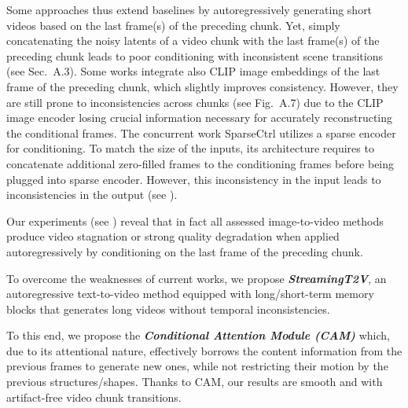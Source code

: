 Some approaches  \cite{oh2023mtvg,AlignYourLatents,video-diffusion-models,opensora}
thus extend baselines by autoregressively generating short videos based on the last frame(s) of the preceding chunk.
%
Yet, simply concatenating the noisy latents of a video chunk with the last frame(s) of the preceding chunk leads to poor conditioning with inconsistent scene transitions 
(see Sec.\ \textcolor{linkblue}{A.3}).
Some works \cite{SVD,2023i2vgenxl,wang2024videocomposer,dai2023animateanything,xing2023dynamicrafter} integrate also CLIP \cite{CLIP_paper} image embeddings of the last frame of the preceding chunk, which slightly improves consistency. However, they are still prone to inconsistencies across chunks 
(see Fig.\ \textcolor{linkblue}{A.7})
due to the CLIP image encoder losing crucial information necessary for accurately reconstructing the conditional frames.
The concurrent work SparseCtrl \cite{guo2023sparsectrl} utilizes a sparse encoder for conditioning. 
To match the size of the inputs, its architecture requires to concatenate additional zero-filled frames to the conditioning frames before being plugged into sparse encoder. However, this inconsistency in the input leads to inconsistencies in the output (see ). 

Our experiments (see ) reveal that in fact all assessed image-to-video methods produce video stagnation or strong quality degradation when applied autoregressively by conditioning on the last frame of the preceding chunk. 

To overcome the weaknesses of current works, we propose \textbf{\textit{StreamingT2V}}, an autoregressive text-to-video method equipped with long/short-term memory blocks that  generates long videos without temporal inconsistencies.

To this end, we propose the \textbf{\textit{Conditional Attention Module (CAM)}} which, due to its attentional nature, effectively borrows the content information from the previous frames to generate new ones, while not restricting their motion by the previous structures/shapes.
Thanks to CAM, our results are smooth and with artifact-free video chunk transitions. 


